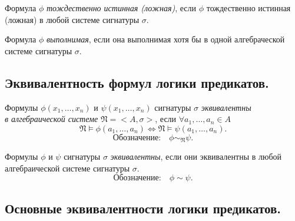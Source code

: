 \begin{definition}
    Формула $ \phi $ \emph{тождественно истинная (ложная)}, если $ \phi $ тождественно истинная (ложная) в любой системе сигнатуры $ \sigma $.

    Формула $ \phi $ \emph{выполнимая}, если она выполнимая хотя бы в одной алгебраческой системе сигнатуры $ \sigma $.
\end{definition}

\newpage

\subsection{Эквивалентность формул логики предикатов.}

\begin{definition}
    Формулы $ \phi(x_1,\ldots,x_n) $ и $ \psi(x_1,\ldots,x_n) $ сигнатуры $ \sigma $ \emph{эквивалентны} \\ \emph{в алгебраической системе} $ \mathfrak{N} = <A,\sigma> $, если $ \forall a_1,\ldots,a_n \in A $
    \[
        \mathfrak{N} \vDash \phi(a_1,\ldots,a_n) \iff \mathfrak{N} \vDash \psi(a_1,\ldots,a_n).
    \]
    \[
        \text{Обозначение:} \quad \phi \sim_\mathfrak{N} \psi.
    \]
\end{definition}

\begin{definition}
    Формулы $ \phi $ и $ \psi $ сигнатуры $ \sigma $ \emph{эквивалентны}, если они эквивалентны в любой алгебраической системе сигнатуры $ \sigma $.
    \[
        \text{Обозначение:} \quad \phi \sim \psi.
    \]
\end{definition}

\subsection{Основные эквивалентности логики предикатов.}

